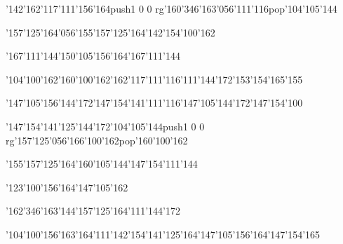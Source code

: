 \null\vfill\ipa\centerline{\enskip\char'142\char'162\char'117\char'111\char'156\char'164\enskip\enskip\enskip\enskip\pdfcolorstack\match push{1 0 0 rg}\char'160\char'346\char'163\char'056\char'111\char'116\pdfcolorstack\match pop{}\enskip\enskip\enskip\char'104\char'105\char'144\enskip\enskip\enskip\enskip}\medskip\centerline{\enskip\char'157\char'125\char'164\char'056\char'155\char'157\char'125\char'164\enskip\enskip\enskip\enskip\enskip\enskip\enskip\enskip\enskip\enskip\enskip\char'142\char'154\char'100\char'162}\medskip\centerline{\enskip\char'167\char'111\char'144\enskip\enskip\enskip\enskip\char'150\char'105\char'156\char'164\enskip\enskip\enskip\char'167\char'111\char'144}\medskip\centerline{\enskip\enskip\enskip\enskip\char'104\char'100\char'162\enskip\char'160\char'100\char'162\enskip\char'162\char'117\char'111\char'116\enskip\char'111\char'144\char'172\enskip\char'153\char'154\char'165\char'155}\medskip\centerline{\enskip\enskip\char'147\char'105\char'156\char'144\char'172\enskip\enskip\enskip\char'147\char'154\char'141\char'111\char'116\enskip\enskip\enskip\enskip\enskip\enskip\char'147\char'105\char'144\char'172\enskip\char'147\char'154\char'100}\medskip\vfill\footline{\hfil\tt\folio\hfil}\eject
\null\vfill\ipa\centerline{\enskip\char'147\char'154\char'141\char'125\char'144\char'172\enskip\enskip\enskip\enskip\char'104\char'105\char'144\enskip\enskip\enskip\enskip\pdfcolorstack\match push{1 0 0 rg}\char'157\char'125\char'056\char'166\char'100\char'162\pdfcolorstack\match pop{}\enskip\char'160\char'100\char'162}\medskip\centerline{\enskip\enskip\enskip\enskip\char'155\char'157\char'125\char'164\enskip\enskip\enskip\enskip\char'160\char'105\char'144\enskip\enskip\enskip\enskip\enskip\char'147\char'154\char'111\char'144}\medskip\centerline{\enskip\enskip\enskip\enskip\enskip\enskip\enskip\enskip\char'123\char'100\char'156\char'164\enskip\enskip\enskip\char'147\char'105\char'162}\medskip\centerline{\enskip\enskip\enskip\enskip\char'162\char'346\char'163\enskip\enskip\enskip\enskip\enskip\char'144\char'157\char'125\char'164\enskip\char'111\char'144\char'172\enskip\enskip\enskip\enskip\enskip}\medskip\centerline{\enskip\enskip\char'104\char'100\char'156\char'163\char'164\enskip\char'111\enskip\char'142\char'154\char'141\char'125\char'164\enskip\enskip\enskip\enskip\enskip\enskip\char'147\char'105\char'156\char'164\enskip\char'147\char'154\char'165}\medskip\vfill\footline{\hfil\tt\folio\hfil}\eject
